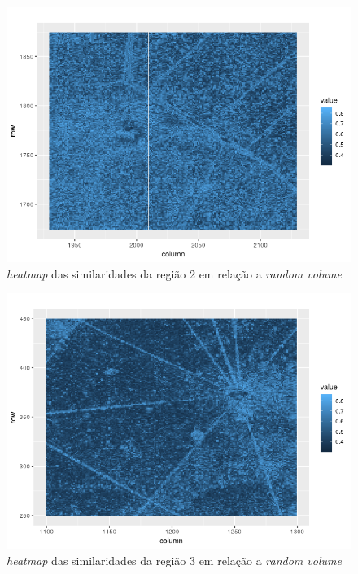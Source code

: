\documentclass[12pt]{article}
\begin{document}
\begin{figure}[!h]

  \centering
  \includegraphics[width=0.8\linewidth]{../../Images/Report_19_02_27/heatmap_rv_region2.png}
  \caption{\textit{heatmap} das similaridades da região 2 em relação a \textit{random volume}}
  \label{fig:heat_rv2}

\end{figure}

\newpage

\begin{figure}[!h]

  \centering
  \includegraphics[width=0.8\linewidth]{../../Images/Report_19_02_27/heatmap_rv_region3.png}
  \caption{\textit{heatmap} das similaridades da região 3 em relação a \textit{random volume}}
  \label{fig:heat_rv3}

\end{figure}
\end{document}
